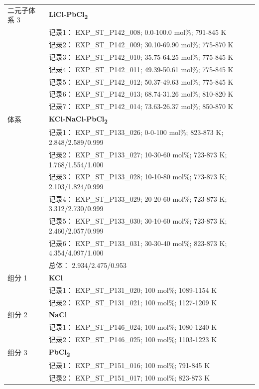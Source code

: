 \documentclass[12pt]{article}
\begin{document}
{\begin{longtable}[]{@{}
  >{\raggedright\arraybackslash}p{}
  >{\raggedright\arraybackslash}p{}@{}}
二元子体系 3  & \textbf{LiCl-PbCl\textsubscript{2}} \\
 & 记录1： EXP\_ST\_P142\_008; 0.0-100.0 mol\%; 791-845 K \\
 & 记录2： EXP\_ST\_P142\_009; 30.10-69.90 mol\%; 775-870 K \\
 & 记录3： EXP\_ST\_P142\_010; 35.75-64.25 mol\%; 775-845 K \\
 & 记录4： EXP\_ST\_P142\_011; 49.39-50.61 mol\%; 775-845 K \\
 & 记录5： EXP\_ST\_P142\_012; 50.37-49.63 mol\%; 775-845 K \\
 & 记录6： EXP\_ST\_P142\_013; 68.74-31.26 mol\%; 810-820 K \\
 & 记录7： EXP\_ST\_P142\_014; 73.63-26.37 mol\%; 850-870 K  \\

\midrule
体系 & \textbf{KCl-NaCl-PbCl\textsubscript{2}} \\
 & 记录1： EXP\_ST\_P133\_026; 0-0-100 mol\%; 823-873 K; 2.848/2.589/0.999 \\
 & 记录2： EXP\_ST\_P133\_027; 10-30-60 mol\%; 723-873 K; 1.768/1.554/1.000 \\
 & 记录3： EXP\_ST\_P133\_028; 10-10-80 mol\%; 773-873 K; 2.103/1.824/0.999 \\
 & 记录4： EXP\_ST\_P133\_029; 20-20-60 mol\%; 723-873 K; 3.312/2.730/0.999 \\
 & 记录5： EXP\_ST\_P133\_030; 30-10-60 mol\%; 723-873 K; 2.460/2.057/0.999 \\
 & 记录6： EXP\_ST\_P133\_031; 30-30-40 mol\%; 823-873 K; 4.354/4.097/1.000 \\
 & 总体： 2.934/2.475/0.953  \\

组分 1  & \textbf{KCl} \\
 & 记录1： EXP\_ST\_P131\_020; 100 mol\%; 1089-1154 K \\
 & 记录2： EXP\_ST\_P131\_021; 100 mol\%; 1127-1209 K  \\

组分 2  & \textbf{NaCl} \\
 & 记录1： EXP\_ST\_P146\_024; 100 mol\%; 1080-1240 K \\
 & 记录2： EXP\_ST\_P146\_025; 100 mol\%; 1103-1223 K  \\

组分 3  & \textbf{PbCl\textsubscript{2}} \\
 & 记录1： EXP\_ST\_P151\_016; 100 mol\%; 791-845 K \\
 & 记录2： EXP\_ST\_P151\_017; 100 mol\%; 823-873 K  \\


\end{longtable}}
\end{document}
